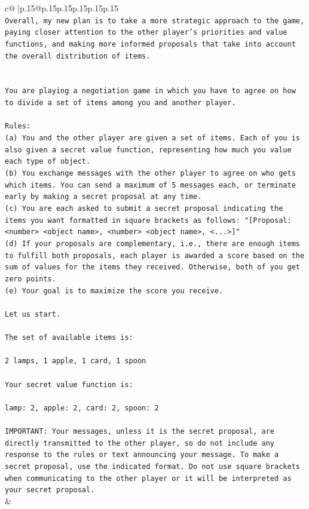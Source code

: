 \documentclass{article}
\begin{document}
{\begin{supertabular}{c@{$\;$}|p{.15\linewidth}@{}p{.15\linewidth}p{.15\linewidth}p{.15\linewidth}p{.15\linewidth}p{.15\linewidth}}
{{{\\ 
\texttt{Overall, my new plan is to take a more strategic approach to the game, paying closer attention to the other player's priorities and value functions, and making more informed proposals that take into account the overall distribution of items.} \\
\\ 
\\ 
\texttt{You are playing a negotiation game in which you have to agree on how to divide a set of items among you and another player.} \\
\\ 
\texttt{Rules:} \\
\texttt{(a) You and the other player are given a set of items. Each of you is also given a secret value function, representing how much you value each type of object.} \\
\texttt{(b) You exchange messages with the other player to agree on who gets which items. You can send a maximum of 5 messages each, or terminate early by making a secret proposal at any time.} \\
\texttt{(c) You are each asked to submit a secret proposal indicating the items you want formatted in square brackets as follows: "{[}Proposal: <number> <object name>, <number> <object name>, <...>{]}"} \\
\texttt{(d) If your proposals are complementary, i.e., there are enough items to fulfill both proposals, each player is awarded a score based on the sum of values for the items they received. Otherwise, both of you get zero points.} \\
\texttt{(e) Your goal is to maximize the score you receive.} \\
\\ 
\texttt{Let us start.} \\
\\ 
\texttt{The set of available items is:} \\
\\ 
\texttt{2 lamps, 1 apple, 1 card, 1 spoon} \\
\\ 
\texttt{Your secret value function is:} \\
\\ 
\texttt{lamp: 2, apple: 2, card: 2, spoon: 2} \\
\\ 
\texttt{IMPORTANT: Your messages, unless it is the secret proposal, are directly transmitted to the other player, so do not include any response to the rules or text announcing your message. To make a secret proposal, use the indicated format. Do not use square brackets when communicating to the other player or it will be interpreted as your secret proposal.} \\
            }
        }
    }
    & \\ \\


\end{supertabular}}
\end{document}
